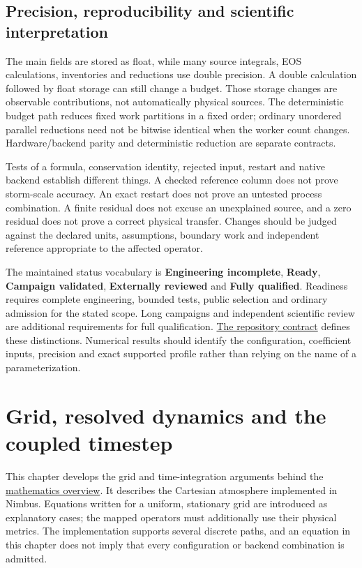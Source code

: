 \documentclass[
  11pt,
]{report}
\begin{document}
\section{Precision, reproducibility and scientific
interpretation}\label{precision-reproducibility-and-scientific-interpretation}

The main fields are stored as float, while many source integrals, EOS
calculations, inventories and reductions use double precision. A double
calculation followed by float storage can still change a budget. Those
storage changes are observable contributions, not automatically physical
sources. The deterministic budget path reduces fixed work partitions in
a fixed order; ordinary unordered parallel reductions need not be
bitwise identical when the worker count changes. Hardware/backend parity
and deterministic reduction are separate contracts.

Tests of a formula, conservation identity, rejected input, restart and
native backend establish different things. A checked reference column
does not prove storm-scale accuracy. An exact restart does not prove an
untested process combination. A finite residual does not excuse an
unexplained source, and a zero residual does not prove a correct
physical transfer. Changes should be judged against the declared units,
assumptions, boundary work and independent reference appropriate to the
affected operator.

The maintained status vocabulary is \textbf{Engineering incomplete},
\textbf{Ready}, \textbf{Campaign validated}, \textbf{Externally
reviewed} and \textbf{Fully qualified}. Readiness requires complete
engineering, bounded tests, public selection and ordinary admission for
the stated scope. Long campaigns and independent scientific review are
additional requirements for full qualification. \href{../AGENTS.md}{The
repository contract} defines these distinctions. Numerical results
should identify the configuration, coefficient inputs, precision and
exact supported profile rather than relying on the name of a
parameterization.



\chapter{Grid, resolved dynamics and the coupled
timestep}\label{grid-theory}

This chapter develops the grid and time-integration arguments behind the
\href{MATHEMATICS.pdf}{mathematics overview}. It describes the Cartesian
atmosphere implemented in Nimbus. Equations written for a uniform,
stationary grid are introduced as explanatory cases; the mapped
operators must additionally use their physical metrics. The
implementation supports several discrete paths, and an equation in this
chapter does not imply that every configuration or backend combination
is admitted.
\end{document}
